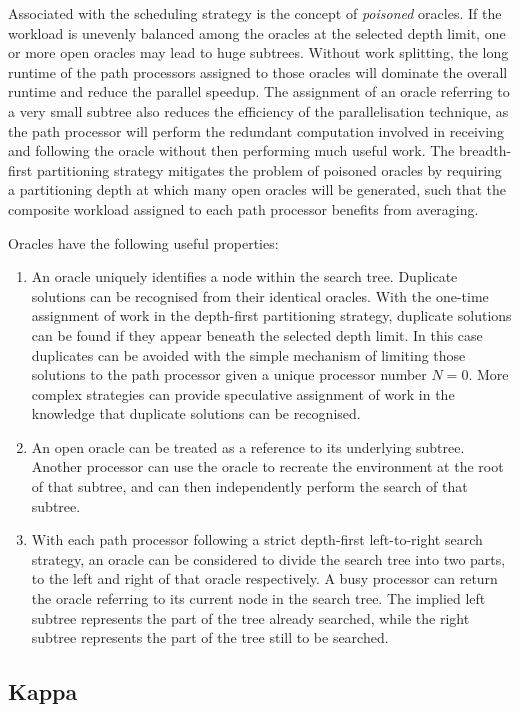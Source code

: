 Associated with the scheduling strategy is the concept of \textit{poisoned}
oracles.  If the workload is unevenly balanced among the oracles at the selected
depth limit, one or more open oracles may lead to huge subtrees.  Without work
splitting,  the long runtime of the path processors assigned to those oracles
will dominate the overall runtime and reduce the parallel speedup.  The assignment
of an oracle referring to a very small subtree also reduces the efficiency of the
parallelisation technique, as the path processor will perform the redundant 
computation involved in receiving and following the oracle without then performing
much useful work.  The breadth-first partitioning strategy mitigates the problem
of poisoned oracles by  requiring a partitioning depth at which many open oracles
will be generated, such that the composite workload assigned to each path processor
benefits from averaging.

Oracles have the following useful properties:
\begin{enumerate}
\item{An oracle uniquely identifies a node within the search tree.
  Duplicate solutions can be recognised from their
  identical oracles.  With the one-time assignment of work in the depth-first
  partitioning strategy, duplicate solutions can be found if they appear beneath
  the selected depth limit.  In this case duplicates can be avoided with the
  simple mechanism of limiting those solutions to the path processor given
  a unique processor number $N=0$.  More complex strategies can provide
  speculative assignment of work in the knowledge that duplicate solutions can
  be recognised.}
\item{An open oracle can be treated as a reference to its underlying subtree.
  Another processor can use the oracle to recreate the environment at the root
  of that subtree, and can then independently perform the search of that subtree.}
\item{With each path processor following a strict depth-first left-to-right
  search strategy, an oracle can be considered to divide the search tree into
  two parts, to the left and right of that oracle respectively.  A busy
  processor can return the oracle referring to its current node in the search
  tree.  The implied left subtree represents the part of the tree already searched, while
  the right subtree represents the part of the tree still to be searched.}
\end{enumerate}

\subsection{Kappa}

